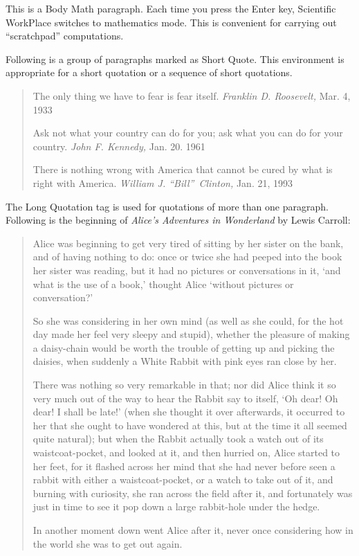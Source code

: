 \documentclass{book}%
\begin{document}
This is a Body Math paragraph. Each time you press the Enter key, Scientific
WorkPlace switches to mathematics mode. This is convenient for carrying out
``scratchpad'' computations.

Following is a group of paragraphs marked as Short Quote. This environment is
appropriate for a short quotation or a sequence of short quotations.

\begin{quote}
The only thing we have to fear is fear itself. \emph{Franklin D. Roosevelt,
}Mar. 4, 1933

Ask not what your country can do for you; ask what you can do for your
country. \emph{John F. Kennedy, }Jan. 20. 1961

There is nothing wrong with America that cannot be cured by what is right with
America. \emph{William J. \textquotedblleft Bill\textquotedblright\ Clinton,
}Jan. 21, 1993
\end{quote}

The Long Quotation tag is used for quotations of more than one paragraph.
Following is the beginning of \emph{Alice's Adventures in Wonderland }by Lewis Carroll:

\begin{quotation}
Alice was beginning to get very tired of sitting by her sister on the bank,
and of having nothing to do: once or twice she had peeped into the book her
sister was reading, but it had no pictures or conversations in it, `and what
is the use of a book,' thought Alice `without pictures or conversation?'

So she was considering in her own mind (as well as she could, for the hot day
made her feel very sleepy and stupid), whether the pleasure of making a
daisy-chain would be worth the trouble of getting up and picking the daisies,
when suddenly a White Rabbit with pink eyes ran close by her.

There was nothing so very remarkable in that; nor did Alice think it so very
much out of the way to hear the Rabbit say to itself, `Oh dear! Oh dear! I
shall be late!' (when she thought it over afterwards, it occurred to her that
she ought to have wondered at this, but at the time it all seemed quite
natural); but when the Rabbit actually took a watch out of its
waistcoat-pocket, and looked at it, and then hurried on, Alice started to her
feet, for it flashed across her mind that she had never before seen a rabbit
with either a waistcoat-pocket, or a watch to take out of it, and burning with
curiosity, she ran across the field after it, and fortunately was just in time
to see it pop down a large rabbit-hole under the hedge.

In another moment down went Alice after it, never once considering how in the
world she was to get out again.
\end{quotation}
\end{document}
